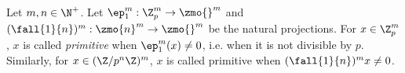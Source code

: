 \begin{dfn}
  
  Let $m, n \in \N^+$. 
  Let $\ep_1^m : \Z_p^m \to \zmo{}^m$ and 
  $(\fall{1}{n})^m : \zmo{n}^m \to \zmo{}^m$ be the natural projections. 
  For $x \in \Z_p^m$, $x$ is called \emph{primitive} when $\ep_1^m(x) \neq 0$,
  i.e. when it is not divisible by $p$. 
  Similarly, for $x \in (\Z/p^n\Z)^m$, 
  $x$ is called primitive when $(\fall{1}{n})^m x \neq 0$. 
\end{dfn}

%   

